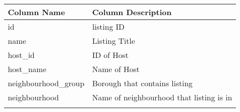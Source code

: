 \begin{longtable}[]{@{}ll@{}}
\toprule
\begin{minipage}[b]{0.25\columnwidth}\raggedright
Column Name\strut
\end{minipage} & \begin{minipage}[b]{0.69\columnwidth}\raggedright
Column Description\strut
\end{minipage}\tabularnewline
\midrule
\endhead
\begin{minipage}[t]{0.25\columnwidth}\raggedright
id\strut
\end{minipage} & \begin{minipage}[t]{0.69\columnwidth}\raggedright
listing ID\strut
\end{minipage}\tabularnewline
\begin{minipage}[t]{0.25\columnwidth}\raggedright
name\strut
\end{minipage} & \begin{minipage}[t]{0.69\columnwidth}\raggedright
Listing Title\strut
\end{minipage}\tabularnewline
\begin{minipage}[t]{0.25\columnwidth}\raggedright
host\_id\strut
\end{minipage} & \begin{minipage}[t]{0.69\columnwidth}\raggedright
ID of Host\strut
\end{minipage}\tabularnewline
\begin{minipage}[t]{0.25\columnwidth}\raggedright
host\_name\strut
\end{minipage} & \begin{minipage}[t]{0.69\columnwidth}\raggedright
Name of Host\strut
\end{minipage}\tabularnewline
\begin{minipage}[t]{0.25\columnwidth}\raggedright
neighbourhood\_group\strut
\end{minipage} & \begin{minipage}[t]{0.69\columnwidth}\raggedright
Borough that contains listing\strut
\end{minipage}\tabularnewline
\begin{minipage}[t]{0.25\columnwidth}\raggedright
neighbourhood\strut
\end{minipage} & \begin{minipage}[t]{0.69\columnwidth}\raggedright
Name of neighbourhood that listing is in\strut
\end{minipage}\tabularnewline
\begin{minipage}[t]{0.25\columnwidth}\raggedright

\end{minipage}
\end{longtable}
